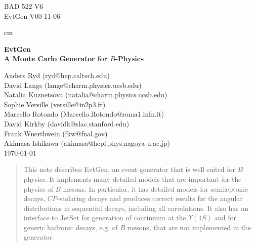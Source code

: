 
%
%
\addtolength{\topmargin}{-0.75in}
\addtolength{\textwidth}{1.1in}
\addtolength{\textheight}{1.25in}
\addtolength{\hoffset}{-0.6in}


\makeindex



\begin{flushright}
BAD 522 V6\\
EvtGen V00-11-06
\end{flushright}

 cm


\begin{center}
\bf \Large {\bf EvtGen\\ 
A Monte Carlo Generator for $B$-Physics}
\end{center}

\begin{center}
Anders Ryd (ryd@hep.caltech.edu)\\
David Lange (lange@charm.physics.ucsb.edu)\\
Natalia Kuznetsova (natalia@charm.physics.ucsb.edu)\\
Sophie Versille (versille@in2p3.fr)\\
Marcello Rotondo (Marcello.Rotondo@roma1.infn.it)\\
David Kirkby (davidk@slac.stanford.edu)\\
Frank Wuerthwein (fkw@fnal.gov)\\
Akimasa Ishikawa (akimasa@hepl.phys.nagoya-u.ac.jp)\\
{\today} \\
\end{center}

\begin{abstract}
\smallskip
This note describes EvtGen, an event generator that 
is well suited for $B$ physics. It implements many
detailed models that are important for the
physics of $B$ mesons. In particular, it has detailed
models for semileptonic decays, $CP$-violating decays and
produces correct results for the angular distributions
in sequential decays, including all correlations.
It also has an interface to JetSet for generation of 
continuum at the $\Upsilon(4S)$ and for generic hadronic
decays, e.g. of $B$ mesons, that are not implemented in the
generator.   
\end{abstract}

\newpage

\tableofcontents


